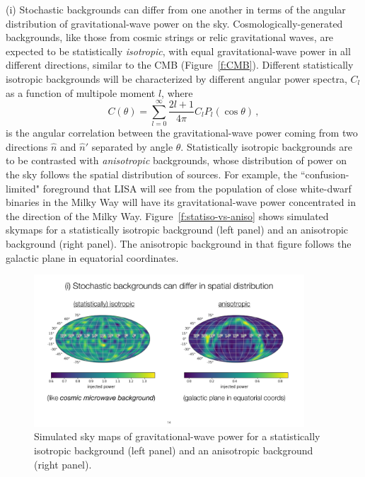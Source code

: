\documentclass[11pt]{article}
\numberwithin{equation}{section}
\def\be{\begin{equation}}
\def\ee{\end{equation}}
\begin{document}
(i) Stochastic backgrounds can differ from one another 
in terms of the angular distribution of 
gravitational-wave power on the sky.
Cosmologically-generated backgrounds, like those from 
cosmic strings or relic gravitational waves,
are expected to be statistically {\em isotropic},
with equal gravitational-wave power in all different
directions, similar to the CMB (Figure~\ref{f:CMB}).
Different statistically isotropic backgrounds will
be characterized by different angular power spectra,
$C_l$ as a function of multipole moment $l$, where
%
\be
C(\theta) = \sum_{l=0}^\infty \frac{2l+1}{4\pi} 
C_l P_l(\cos\theta)\,,
\ee
%
is the angular correlation between the gravitational-wave
power coming from two directions $\hat n$ and $\hat n'$
separated by angle $\theta$.
Statistically isotropic backgrounds are to be contrasted
with {\em anisotropic} backgrounds, whose distribution of
power on the sky follows the spatial distribution of 
sources.
For example, the ``confusion-limited" foreground that 
LISA will see from the population of close white-dwarf 
binaries in the Milky Way will have its gravitational-wave 
power concentrated in the direction of the Milky Way.
Figure~\ref{f:statiso-vs-aniso} shows simulated skymaps 
for a statistically isotropic background (left panel) and an
anisotropic background (right panel). 
The anisotropic background in that figure follows the
galactic plane in equatorial coordinates. 
%
\begin{figure}[htbp!]
\begin{center}
\includegraphics[width=0.9\textwidth]{Figures/statiso-vs-aniso}
\caption{Simulated sky maps of gravitational-wave power
for a statistically isotropic background (left panel) and an 
anisotropic background (right panel).}
\label{f:GWspectrum}
\end{center}
\end{figure}
%
\end{document}
